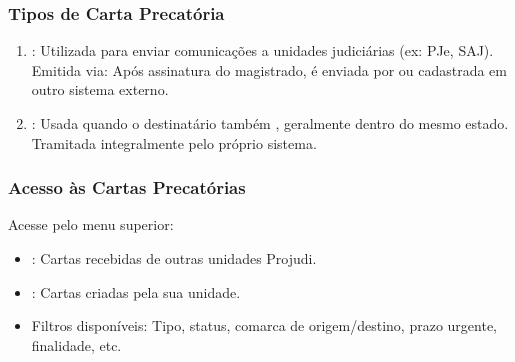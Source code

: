 \documentclass[letterpaper,10pt,brazil]{sphinxmanual}
\begin{document}
\subsubsection{Tipos de Carta Precatória}
\label{\detokenize{projud_44_cartaprecatoriaeletronica:tipos-de-carta-precatoria}}\begin{enumerate}
%
\item {} 
\sphinxAtStartPar
{}:
\sphinxhyphen{} Utilizada para enviar comunicações a unidades judiciárias  (ex: PJe, SAJ).
\sphinxhyphen{} Emitida via: 
\sphinxhyphen{} Após assinatura do magistrado, é enviada por  ou cadastrada em outro sistema externo.

\item {} 
\sphinxAtStartPar
{}:
\sphinxhyphen{} Usada quando o destinatário também , geralmente dentro do mesmo estado.
\sphinxhyphen{} Tramitada integralmente pelo próprio sistema.

\end{enumerate}


\subsubsection{Acesso às Cartas Precatórias}
\label{\detokenize{projud_44_cartaprecatoriaeletronica:acesso-as-cartas-precatorias}}
\sphinxAtStartPar
Acesse pelo menu superior:

\sphinxAtStartPar
{}
\begin{itemize}
\item {} 
\sphinxAtStartPar
{}: Cartas recebidas de outras unidades Projudi.

\item {} 
\sphinxAtStartPar
{}: Cartas criadas pela sua unidade.

\item {} 
\sphinxAtStartPar
Filtros disponíveis: Tipo, status, comarca de origem/destino, prazo urgente, finalidade, etc.

\end{itemize}
\end{document}
